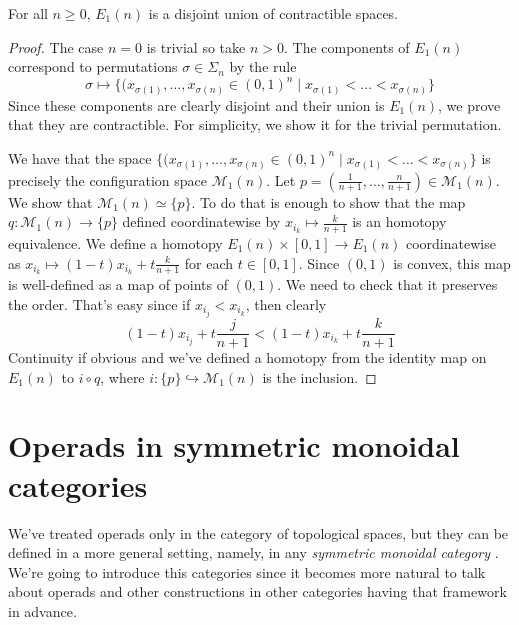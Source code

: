 \documentclass[TFM.tex]{subfiles}
\begin{document}
\begin{prop}\label{E1}
For all $n\geq 0$, $E_1(n)$ is a disjoint union of contractible spaces.
\end{prop}
\begin{proof}
The case $n=0$ is trivial so take $n>0$. The components of $E_1(n)$ correspond to permutations $\sigma\in\Sigma_n$ by the rule
\[
\sigma\mapsto \{(x_{\sigma(1)},\dots, x_{\sigma(n)}\in (0,1)^n\mid x_{\sigma(1)}<\dots< x_{\sigma(n)}\}
\]
Since these components are clearly disjoint and their union is $E_1(n)$, we prove that they are contractible. For simplicity, we show it for the trivial permutation. 

We have that the space $\{(x_{\sigma(1)},\dots, x_{\sigma(n)}\in (0,1)^n\mid x_{\sigma(1)}<\dots< x_{\sigma(n)}\}$  is precisely the configuration space $\mathcal{M}_1(n)$. Let $p=\left(\frac{1}{n+1},\dots, \frac{n}{n+1}\right)\in \mathcal{M}_1(n)$. We show that $\mathcal{M}_1(n)\simeq \{p\}$. To do that is enough to show that the map $q:\mathcal{M}_1(n)\to \{p\}$ defined coordinatewise by $x_{i_k}\mapsto \frac{k}{n+1}$ is an homotopy equivalence. We define a homotopy $E_1(n)\times [0,1]\to E_1(n)$ coordinatewise as $x_{i_k}\mapsto (1-t)x_{i_k}+t\frac{k}{n+1}$ for each $t\in [0,1]$. Since $(0,1)$ is convex, this map is well-defined as a map of points of $(0,1)$. We need to check that it preserves the order. That's easy since if $x_{i_j}<x_{i_k}$, then clearly 
\[
(1-t)x_{i_j}+t\frac{j}{n+1}<(1-t)x_{i_k}+t\frac{k}{n+1}
\] 
Continuity if obvious and we've defined a homotopy from the identity map on $E_1(n)$ to $i\circ q$, where $i:\{p\}\hookrightarrow \mathcal{M}_1(n)$ is the inclusion. 
\end{proof}








\section{Operads in symmetric monoidal categories}
We've treated operads only in the category of topological spaces, but they can be defined in a more general setting, namely, in any \emph{symmetric monoidal category} \cite{Yau}. We're going to introduce this categories since it becomes more natural to talk about operads and other constructions in other categories having that framework in advance.
\end{document}
